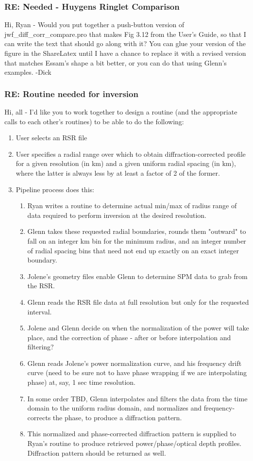 \documentclass[crop=false,class=book]{standalone}
\begin{document}
\subsubsection{\footnotesize RE: Needed - Huygens Ringlet Comparison}
Hi, Ryan - Would you put together a push-button version of jwf\_diff\_corr\_compare.pro that makes Fig 3.12 from the User's Guide, so that I can write the text that should go along with it? You can glue your version of the figure in the ShareLatex until I have a chance to replace it with a revised version that matches Essam's shape a bit better, or you can do that using Glenn's examples. -Dick
\subsubsection{\footnotesize RE: Routine needed for inversion}
Hi, all - I'd like you to work together to design a routine (and the appropriate calls to each other's routines) to be able to do the following:
\begin{enumerate}
    \item User selects an RSR file
    \item User specifies a radial range over which to obtain diffraction-corrected profile for a given resolution (in km) and a given uniform radial spacing (in km), where the latter is always less by at least a factor of 2 of the former.
    \item Pipeline process does this:
    \begin{enumerate}
        \item Ryan writes a routine to determine actual min/max of radius range of data required to perform inversion at the desired resolution.
        \item Glenn takes these requested radial boundaries, rounds them "outward" to fall on an integer km bin for the minimum radius, and an integer number of radial spacing bins that need not end up exactly on an exact integer boundary.
        \item Jolene's geometry files enable Glenn to determine SPM data to grab from the RSR.
        \item Glenn reads the RSR file data at full resolution but only for the requested interval.
        \item Jolene and Glenn decide on when the normalization of the power will take place, and the correction of phase - after or before interpolation and filtering?
        \item Glenn reads Jolene's power normalization curve, and his frequency drift curve (need to be sure not to have phase wrapping if we are interpolating phase) at, say, 1 sec time resolution.
        \item In some order TBD, Glenn interpolates and filters the data from the time domain to the uniform radius domain, and normalizes and frequency-corrects the phase, to produce a diffraction pattern.
        \item This normalized and phase-corrected diffraction pattern is supplied to Ryan's routine to produce retrieved power/phase/optical depth profiles. Diffraction pattern should be returned as well.
    \end{enumerate}
\end{enumerate}
\end{document}
